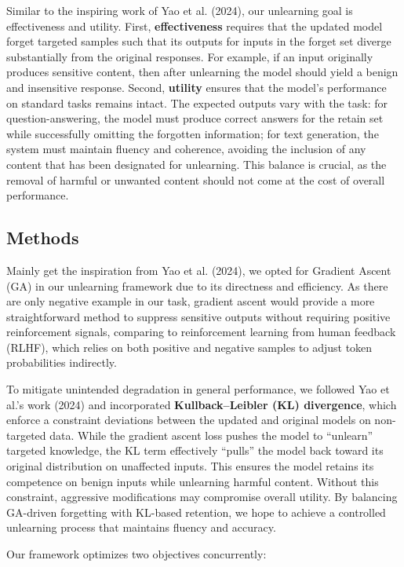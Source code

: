 \documentclass[11pt]{article}
\begin{document}
Similar to the inspiring work of Yao et al. (2024), our unlearning goal is effectiveness and utility. First, \textbf{effectiveness} requires that the updated model forget targeted samples such that its outputs for inputs in the forget set diverge substantially from the original responses. For example, if an input originally produces sensitive content, then after unlearning the model should yield a benign and insensitive response. Second, \textbf{utility} ensures that the model’s performance on standard tasks remains intact. The expected outputs vary with the task: for question-answering, the model must produce correct answers for the retain set while successfully omitting the forgotten information; for text generation, the system must maintain fluency and coherence, avoiding the inclusion of any content that has been designated for unlearning. This balance is crucial, as the removal of harmful or unwanted content should not come at the cost of overall performance.

\subsection*{Methods}

Mainly get the inspiration from Yao et al. (2024), we opted for Gradient Ascent (GA) in our unlearning framework due to its directness and efficiency. As there are only negative example in our task, gradient ascent would provide a more straightforward method to suppress sensitive outputs without requiring positive reinforcement signals, comparing to reinforcement learning from human feedback (RLHF), which relies on both positive and negative samples to adjust token probabilities indirectly. 

To mitigate unintended degradation in general performance, we followed Yao et al.'s work (2024) and incorporated \textbf{Kullback--Leibler (KL) divergence}, which enforce a constraint deviations between the updated and original models on non-targeted data. While the gradient ascent loss pushes the model to “unlearn” targeted knowledge, the KL term effectively “pulls” the model back toward its original distribution on unaffected inputs. This ensures the model retains its competence on benign inputs while unlearning harmful content. Without this constraint, aggressive modifications may compromise overall utility. By balancing GA-driven forgetting with KL-based retention, we hope to achieve a controlled unlearning process that maintains fluency and accuracy.

Our framework optimizes two objectives concurrently:
\end{document}
